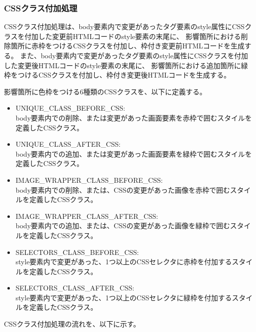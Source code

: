 \subsubsection{CSSクラス付加処理}\label{subsubsec: css_define}
CSSクラス付加処理は、body要素内で変更があったタグ要素のstyle属性にCSSクラス\cite{CssSelector}を付加した変更前HTMLコードのstyle要素の末尾に、
影響箇所における削除箇所に赤枠をつけるCSSクラスを付加し、枠付き変更前HTMLコードを生成する。
また、body要素内で変更があったタグ要素のstyle属性にCSSクラス\cite{CssSelector}を付加した変更後HTMLコードのstyle要素の末尾に、
影響箇所における追加箇所に緑枠をつけるCSSクラスを付加し、枠付き変更後HTMLコードを生成する。
\par
影響箇所に色枠をつける6種類のCSSクラスを、以下に定義する。
\begin{itemize}
    \setlength{\itemsep}{0pt}
          \setlength{\parsep}{0pt}
    \item UNIQUE\_CLASS\_BEFORE\_CSS:\\
          body要素内での削除、または変更があった画面要素を赤枠で囲むスタイルを定義したCSSクラス。
    \item UNIQUE\_CLASS\_AFTER\_CSS:\\
          body要素内での追加、または変更があった画面要素を緑枠で囲むスタイルを定義したCSSクラス。
    \item IMAGE\_WRAPPER\_CLASS\_BEFORE\_CSS:\\
          body要素内での削除、または、CSSの変更があった画像を赤枠で囲むスタイルを定義したCSSクラス。
    \item IMAGE\_WRAPPER\_CLASS\_AFTER\_CSS:\\
          body要素内での追加、または、CSSの変更があった画像を緑枠で囲むスタイルを定義したCSSクラス。
    \item SELECTORS\_CLASS\_BEFORE\_CSS:\\
          style要素内で変更があった、1つ以上のCSSセレクタに赤枠を付加するスタイルを定義したCSSクラス。
    \item SELECTORS\_CLASS\_AFTER\_CSS:\\
          style要素内で変更があった、1つ以上のCSSセレクタに緑枠を付加するスタイルを定義したCSSクラス。
\end{itemize}
\par
CSSクラス付加処理の流れを、以下に示す。
